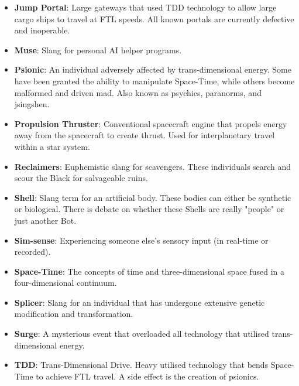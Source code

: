 \documentclass[10pt,twoside]{article}
\begin{document}
\begin{multicols}{2}
\begin{itemize}
            \item \textbf{Jump Portal}: Large gateways that used TDD technology to allow large cargo ships to travel at FTL speeds. All known portals are currently defective and inoperable.

            \item \textbf{Muse}: Slang for personal AI helper programs.

            \item \textbf{Psionic}: An individual adversely affected by trans-dimensional energy. Some have been granted the ability to manipulate Space-Time, while others become malformed and driven mad. Also known as psychics, paranorms, and jsingshen.

            \item \textbf{Propulsion Thruster}: Conventional spacecraft engine that propels energy away from the spacecraft to create thrust. Used for interplanetary travel within a star system.

            \item \textbf{Reclaimers}: Euphemistic slang for scavengers. These individuals search and scour the Black for salvageable ruins.

            \item \textbf{Shell}: Slang term for an artificial body. These bodies can either be synthetic or biological. There is debate on whether these Shells are really "people" or just another Bot.

            \item \textbf{Sim-sense}: Experiencing someone else's sensory input (in real-time or recorded).

            \item \textbf{Space-Time}: The concepts of time and three-dimensional space fused in a four-dimensional continuum.

            \item \textbf{Splicer}: Slang for an individual that has undergone extensive genetic modification and transformation.

            \item \textbf{Surge}: A mysterious event that overloaded all technology that utilised trans-dimensional energy.

            \item \textbf{TDD}: Trans-Dimensional Drive. Heavy utilised technology that bends Space-Time to achieve FTL travel. A side effect is the creation of psionics.


\end{itemize}
\end{multicols}
\end{document}
